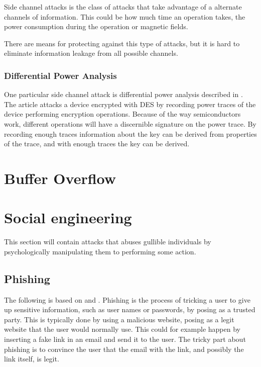 Side channel attacks is the class of attacks that take advantage of a alternate channels of information.
This could be how much time an operation takes, the power consumption during the operation or magnetic fields.

There are means for protecting against this type of attacks, but it is hard to eliminate information leakage from all possible channels.

\subsubsection{Differential Power Analysis}
One particular side channel attack is differential power analysis described in \citet{DPA}.
The article attacks a device encrypted with DES by recording power traces of the device performing encryption operations.
Because of the way semiconductors work, different operations will have a discernible signature on the power trace.
By recording enough traces information about the key can be derived from properties of the trace, and with enough traces the key can be derived.


\section{Buffer Overflow}


\section{Social engineering}
This section will contain attacks that abuses gullible individuals by psychologically manipulating them to performing some action.

\subsection{Phishing}

The following is based on \citet{security_engineering_ross_anderson} and \citet{dhamija2006phishing}.
Phishing is the process of tricking a user to give up sensitive information, such as user names or passwords, by posing as a trusted party.
This is typically done by using a malicious website, posing as a legit website that the user would normally use.
This could for example happen by inserting a fake link in an email and send it to the user.
The tricky part about phishing is to convince the user that the email with the link, and possibly the link itself, is legit.

